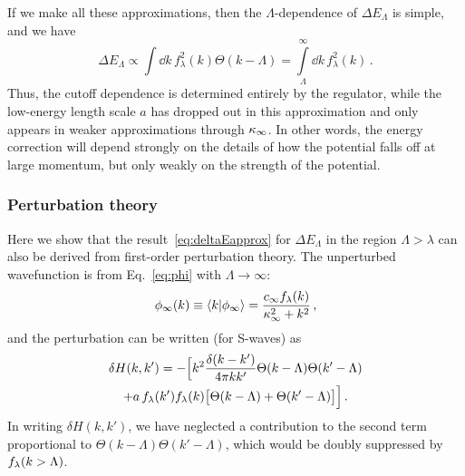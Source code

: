 	If we make all these approximations, then the $\Lambda$-dependence of
	$\Delta E_{\Lambda}$ is simple, and we have
	\begin{equation}
	 \Delta E_{\Lambda} \propto \int\!\dd k\, f^2_\lambda(k)\Theta(k-\Lambda)
	 = \int\limits_\Lambda^\infty \dd k\, f^2_\lambda(k) \,.
	\label{eq:final}
	\end{equation}
	Thus, the cutoff dependence is determined entirely by the regulator,
	while the low-energy length scale $a$ has dropped out in this
	approximation and only appears in weaker approximations through
	$\kappa_{\infty}$.  In other words, the energy correction will depend strongly
	on the details of how the potential falls off at large momentum, but
	only weakly on the strength of the potential.

	\medskip
	\subsubsection{Perturbation theory}

	Here we show that the result~\eqref{eq:deltaEapprox} for $\Delta
	E_{\Lambda}$ in the region $\Lambda > \lambda$ can also be derived
	from first-order perturbation theory.  The unperturbed wavefunction is
	from Eq.~\eqref{eq:phi} with $\Lambda\rightarrow\infty$:
	\begin{equation}
	 \phi_{\infty}(k) \equiv \langle k | \phi_{\infty} \rangle
	 = \frac{c_{\infty} f_{\lambda}(k)}{\kappa_{\infty}^2+k^2}
	 \,,
	\label{eq:phiunperturb}
	\end{equation}
	and the perturbation can be written  (for S-waves) as
	\begin{multline}
	 \delta H(k,k') =
	    -\Big[
	     k^2 \frac{\delta(k-k')}{4\pi kk'} \Theta(k-\Lambda) \Theta(k'-\Lambda) \\
	     + a\,f_{\lambda}(k')f_{\lambda}(k) \big[\Theta(k-\Lambda) + \Theta(k'-\Lambda)\big]
	    \Big] \,.
	\label{eq:sepperturbation}
	\end{multline}
	In writing $\delta H(k,k')$, we have
	neglected a contribution to the second term proportional to $\Theta(k-\Lambda)
	\Theta(k'-\Lambda)$, which would be doubly suppressed by $f_{\lambda}(k>\Lambda)$.

